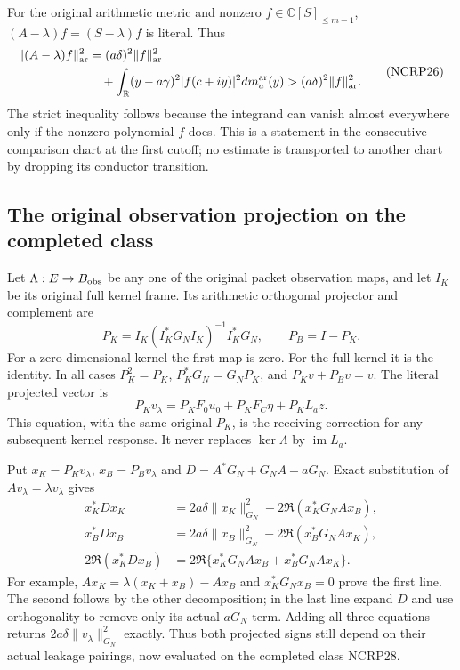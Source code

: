 For the original arithmetic metric and nonzero
$f\in\mathbb C[S]_{\le m-1}$,
$(A-\lambda)f=(S-\lambda)f$ is literal. Thus
\[
 \begin{split}
 \|(A-\lambda)f\|_{\rm ar}^2
 &=(a\delta)^2\|f\|_{\rm ar}^2\\
 &\quad+\int_{\mathbb R}(y-a\gamma)^2
                      |f(c+iy)|^2dm_a^{\rm ar}(y)
 >(a\delta)^2\|f\|_{\rm ar}^2 .
 \end{split}                                                     \tag{NCRP26}
\]
The strict inequality follows because the integrand can vanish
almost everywhere only if the nonzero polynomial $f$ does.
This is a statement in the consecutive comparison chart at the
first cutoff; no estimate is transported to another chart by
dropping its conductor transition.

\subsection{The original observation projection on the completed class}

Let $\Lambda:E\to B_{\rm obs}$ be any one of the original packet
observation maps, and let $I_K$ be its original full kernel frame.
Its arithmetic orthogonal projector and complement are
\[
 P_K=I_K(I_K^*G_NI_K)^{-1}I_K^*G_N,\qquad P_B=I-P_K.
 \tag{NCRP27}
\]
For a zero-dimensional kernel the first map is zero. For the full
kernel it is the identity. In all cases
$P_K^2=P_K$, $P_K^*G_N=G_NP_K$, and
$P_Kv+P_Bv=v$.
The literal projected vector is
\[
 P_Kv_\lambda
  =P_KF_0u_0+P_KF_C\eta+P_KL_az.
 \tag{NCRP28}
\]
This equation, with the same original $P_K$, is the receiving
correction for any subsequent kernel response. It never replaces
$\ker\Lambda$ by $\operatorname{im}L_a$.

Put $x_K=P_Kv_\lambda$, $x_B=P_Bv_\lambda$ and
$D=A^*G_N+G_NA-aG_N$. Exact substitution of
$Av_\lambda=\lambda v_\lambda$ gives
\[
 \begin{split}
 x_K^*Dx_K
   &=2a\delta\|x_K\|_{G_N}^2
                    -2\Re(x_K^*G_NAx_B),\\
 x_B^*Dx_B
   &=2a\delta\|x_B\|_{G_N}^2
                    -2\Re(x_B^*G_NAx_K),\\
 2\Re(x_K^*Dx_B)
   &=2\Re\{x_K^*G_NAx_B+x_B^*G_NAx_K\}.
 \end{split}                                                     \tag{NCRP29}
\]
For example, $Ax_K=\lambda(x_K+x_B)-Ax_B$ and
$x_K^*G_Nx_B=0$ prove the first line. The second follows by
the other decomposition; in the last line expand $D$ and use
orthogonality to remove only its actual $aG_N$ term.
Adding all three equations returns
$2a\delta\|v_\lambda\|_{G_N}^2$ exactly.
Thus both projected signs still depend on their actual leakage
pairings, now evaluated on the completed class NCRP28.

